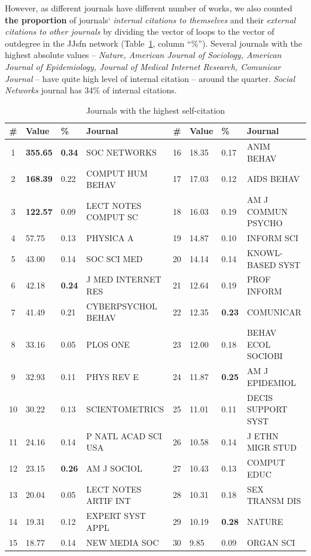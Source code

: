 \documentclass[11pt]{article} %
\begin{document}
However, as different journals have different number of works, we also counted \textbf{the proportion} of journals` \textit{internal citations to themselves} and their \textit{external citations to other journals} by dividing the vector of loops to the vector of outdegree in the JJsfn network (Table~\ref{jselfcite}, column ``\%''). Several journals with the highest absolute values -- \textit{Nature, American Journal of Sociology, American Journal of Epidemiology, Journal of Medical Internet Research, Comunicar Journal} -- have quite high level of internal citation -- around the quarter. \textit{Social Networks} journal has 34\% of internal citations. \medskip 

\begin{table}
\caption{Journals with the highest self-citation} \label{jselfcite}\medskip
\renewcommand{\arraystretch}{0.95}
\small
\begin{center}
\begin{tabular}{c|l|l|l|c|l|l|l|} 
\# &	Value& \% &	Journal &  \# &	Value& \% & Journal \\ \hline 
1 &	\textbf{355.65}&	\textbf{0.34}&	SOC NETWORKS&	16&	       18.35 &    0.17	  &     ANIM BEHAV\\
2 &	\textbf{168.39}&	0.22&	COMPUT HUM BEHAV&	17&    17.03 & 	  0.12	  &     AIDS BEHAV\\
3 &	\textbf{122.57}&	0.09&	LECT NOTES COMPUT SC&	18&    16.03 & 	  0.19	  &     AM J COMMUN PSYCHO \\
4 &	57.75&	0.13&	PHYSICA A&	19&	       14.87 &	  0.10	  &     INFORM SCI\\
5 &	43.00&	0.14&	SOC SCI MED&	20&	       14.14 &	  0.14	  &     KNOWL-BASED SYST\\
6 &	42.18&	\textbf{0.24}&	J MED INTERNET RES&	21&    12.64 &	  0.19	  &     PROF INFORM\\
7 &	41.49&	0.21&	CYBERPSYCHOL BEHAV&	22&    12.35 & 	 \textbf{0.23}	  &     COMUNICAR\\
8 &	33.16&	0.05&	PLOS ONE&	23&	       12.00 & 	  0.18	  &     BEHAV ECOL SOCIOBI \\
9 &	32.93&	0.11&	PHYS REV E&	24&	       11.87 & 	  \textbf{0.25}	  &     AM J EPIDEMIOL\\
10 &	30.22&	0.13&	SCIENTOMETRICS&	25&	       11.01 & 	  0.11	  &     DECIS SUPPORT SYST \\
11 &	24.16&	0.14&	P NATL ACAD SCI USA&	26&    10.58 & 	  0.14	  &     J ETHN MIGR STUD\\
12 &	23.15&	\textbf{0.26}&	AM J SOCIOL&	27&	       10.43 & 	  0.13	  &     COMPUT EDUC\\
13 &	20.04&	0.05&	LECT NOTES ARTIF INT&	28&    10.31 & 	  0.18	  &     SEX TRANSM DIS\\
14 &	19.31&	0.12&	EXPERT SYST APPL&	29&    10.19 & 	 \textbf{0.28}	  &     NATURE\\
15 &	18.77&	0.14&	NEW MEDIA SOC&	30&	       9.85 & 	  0.09	  &     ORGAN SCI\\ \hline 
\end{tabular} 
\end{center}
\end{table}  
\end{document}
